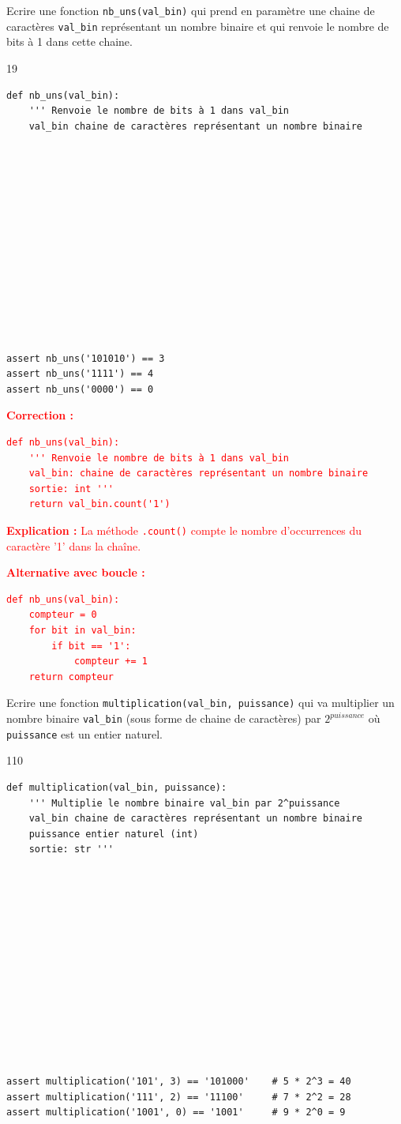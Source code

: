 \documentclass[a4paper,10pt]{report}
\def\ptsexoK{1}
\begin{document}
Ecrire une fonction \verb|nb_uns(val_bin)| qui prend en paramètre une chaine de caractères \verb|val_bin| représentant un nombre binaire et qui renvoie le nombre de bits à 1 dans cette chaine.

    \begin{answer}{1}{9}
\begin{verbatim}
def nb_uns(val_bin):
    ''' Renvoie le nombre de bits à 1 dans val_bin
    val_bin chaine de caractères représentant un nombre binaire
    













assert nb_uns('101010') == 3
assert nb_uns('1111') == 4
assert nb_uns('0000') == 0
    \end{verbatim}

    \end{answer}

\textcolor{red}{
\textbf{Correction :}
\begin{verbatim}
def nb_uns(val_bin):
    ''' Renvoie le nombre de bits à 1 dans val_bin
    val_bin: chaine de caractères représentant un nombre binaire
    sortie: int '''
    return val_bin.count('1')
\end{verbatim}
\textbf{Explication :} La méthode \verb|.count()| compte le nombre d'occurrences du caractère '1' dans la chaîne.

\textbf{Alternative avec boucle :}
\begin{verbatim}
def nb_uns(val_bin):
    compteur = 0
    for bit in val_bin:
        if bit == '1':
            compteur += 1
    return compteur
\end{verbatim}
}

    \medskip

     \exods{\ptsexoK}

Ecrire une fonction \verb|multiplication(val_bin, puissance)| qui va multiplier un nombre binaire \verb|val_bin| (sous forme de chaine de caractères) par $2^{puissance}$ où \verb|puissance| est un entier naturel.
    \begin{answer}{1}{10}
\begin{verbatim}
def multiplication(val_bin, puissance):
    ''' Multiplie le nombre binaire val_bin par 2^puissance
    val_bin chaine de caractères représentant un nombre binaire
    puissance entier naturel (int)
    sortie: str '''














assert multiplication('101', 3) == '101000'    # 5 * 2^3 = 40
assert multiplication('111', 2) == '11100'     # 7 * 2^2 = 28
assert multiplication('1001', 0) == '1001'     # 9 * 2^0 = 9
    \end{verbatim}

    \end{answer}
\end{document}
